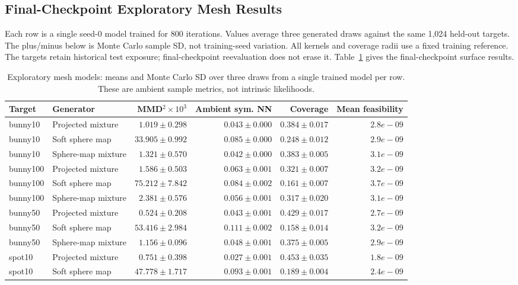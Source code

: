 \subsection{Final-Checkpoint Exploratory Mesh Results}
Each row is a single seed-0 model trained for 800 iterations. Values average three generated draws against the same 1,024 held-out targets. The plus/minus below is Monte Carlo sample SD, not training-seed variation. All kernels and coverage radii use a fixed training reference. The targets retain historical test exposure; final-checkpoint reevaluation does not erase it.
Table~\ref{tab:mesh} gives the final-checkpoint surface results.
\begin{table}[t]\caption{Exploratory mesh models: means and Monte Carlo SD over three draws from a single trained model per row. These are ambient sample metrics, not intrinsic likelihoods.}\label{tab:mesh}\centering\small\begin{tabular}{@{}llrrrr@{}}\toprule
Target & Generator & MMD$^2\times10^3$ & Ambient sym. NN & Coverage & Mean feasibility \\
\midrule
bunny10 & Projected mixture & $1.019\pm0.298$ & $0.043\pm0.000$ & $0.384\pm0.017$ & $2.8e-09$ \\
bunny10 & Soft sphere map & $33.905\pm0.992$ & $0.085\pm0.000$ & $0.248\pm0.012$ & $2.9e-09$ \\
bunny10 & Sphere-map mixture & $1.321\pm0.570$ & $0.042\pm0.000$ & $0.383\pm0.005$ & $3.1e-09$ \\
bunny100 & Projected mixture & $1.586\pm0.503$ & $0.063\pm0.001$ & $0.321\pm0.007$ & $3.2e-09$ \\
bunny100 & Soft sphere map & $75.212\pm7.842$ & $0.084\pm0.002$ & $0.161\pm0.007$ & $3.7e-09$ \\
bunny100 & Sphere-map mixture & $2.381\pm0.576$ & $0.056\pm0.001$ & $0.317\pm0.020$ & $3.1e-09$ \\
bunny50 & Projected mixture & $0.524\pm0.208$ & $0.043\pm0.001$ & $0.429\pm0.017$ & $2.7e-09$ \\
bunny50 & Soft sphere map & $53.416\pm2.984$ & $0.111\pm0.002$ & $0.158\pm0.014$ & $3.2e-09$ \\
bunny50 & Sphere-map mixture & $1.156\pm0.096$ & $0.048\pm0.001$ & $0.375\pm0.005$ & $2.9e-09$ \\
spot10 & Projected mixture & $0.751\pm0.398$ & $0.027\pm0.001$ & $0.453\pm0.035$ & $1.8e-09$ \\
spot10 & Soft sphere map & $47.778\pm1.717$ & $0.093\pm0.001$ & $0.189\pm0.004$ & $2.4e-09$ \\

\end{tabular}
\end{table}

